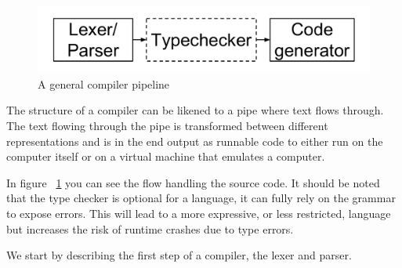 
\begin{figure}[h!]
  \centering
  \includegraphics[width=0.6\pdfpagewidth]{figure/general-pipeline}
  \caption{A general compiler pipeline}
  \label{fig:generalpipeline}
\end{figure}


The structure of a compiler can be likened to a pipe where text flows through. 
The text flowing through the pipe is transformed between different representations and is in
the end output as runnable code to either run on the computer itself or on a virtual machine
that emulates a computer. 

In figure ~\ref{fig:generalpipeline} you can see the flow handling the source code.
It should be noted that the type checker is optional for a language, it can
fully rely on the grammar to expose errors. This will lead to a more expressive, 
or less restricted, language but increases the risk of runtime crashes due to type errors.

We start by describing the first step of a compiler, the lexer and parser.









